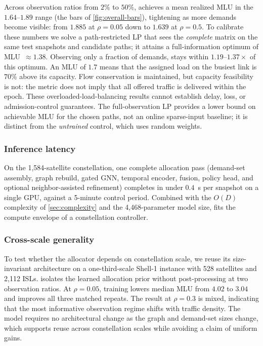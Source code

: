 Across observation ratios from $2\%$ to $50\%$, \sysname{} achieves a
mean realized MLU in the $1.64$--$1.89$ range (the \sysname{} bars of
\cref{fig:overall-bars}), tightening as more demands become visible: from $1.885$
at $\rho=0.05$ down to $1.639$ at $\rho=0.5$. To calibrate these numbers we
solve a path-restricted LP that sees the \emph{complete} matrix on the same
test snapshots and candidate paths; it attains a full-information optimum of
MLU~${\approx}1.38$. Observing only a fraction of demands, \sysname{} stays
within $1.19$--$1.37\times$ of this optimum. An MLU of $1.7$ means that the
assigned load on the busiest link is $70\%$ above its capacity. Flow
conservation is maintained, but capacity feasibility is not: the metric
does not imply that all offered traffic is delivered within the epoch.
These overloaded-load-balancing results cannot establish delay, loss, or
admission-control guarantees. The full-observation LP provides a lower bound
on achievable MLU for the chosen paths, not an online sparse-input baseline;
it is distinct from the \emph{untrained} control, which uses random weights.

\subsubsection{Inference latency}
\label{sec:runtime}
On the 1{,}584-satellite constellation, one complete allocation pass
(demand-set assembly, graph rebuild, gated GNN, temporal encoder, fusion,
policy head, and optional neighbor-assisted refinement) completes in under
$0.4$~s per snapshot on a single GPU, against a 5-minute control period.
Combined with the $O(D)$ complexity of \cref{sec:complexity} and the
4{,}468-parameter model size, \sysname{} fits the compute envelope of a
constellation controller.

\subsubsection{Cross-scale generality}
\label{sec:cross-scale}
To test whether the allocator depends on constellation scale, we reuse its
size-invariant architecture on a one-third-scale Shell-1 instance with 528
satellites and 2{,}112 ISLs.  isolates the learned
allocation prior without post-processing at two observation ratios. At
$\rho=0.05$, training lowers median MLU from $4.02$ to $3.04$ and improves all
three matched repeats. The result at $\rho=0.3$ is mixed, indicating that the
most informative observation regime shifts with traffic density. The model
requires no architectural change as the graph and demand-set sizes change,
which supports reuse across constellation scales while avoiding a claim of
uniform gains.

